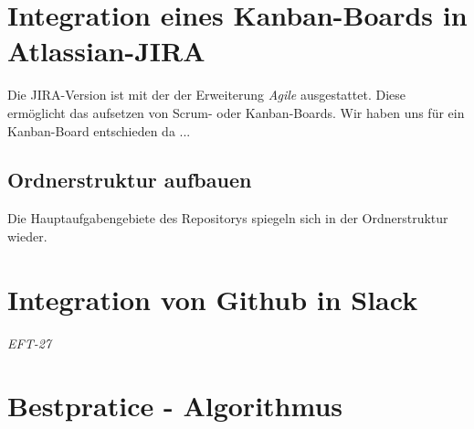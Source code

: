 \documentclass{article}
\begin{document}
\section{Integration eines Kanban-Boards in Atlassian-JIRA}
Die JIRA-Version ist mit der der Erweiterung \emph{Agile} ausgestattet. 
Diese ermöglicht das aufsetzen von Scrum- oder Kanban-Boards. Wir haben uns für ein Kanban-Board entschieden da ... 


\subsection{Ordnerstruktur aufbauen}
Die Hauptaufgabengebiete des Repositorys spiegeln sich in der Ordnerstruktur wieder.

\DTsetlength{0.2em}{3em}{0.2em}{0.4pt}{2.6pt}


\section{Integration von Github in Slack}
\emph{EFT-27}


\section{Bestpratice - Algorithmus}



\begin{thebibliography}{}

\end{thebibliography}
\end{document}
